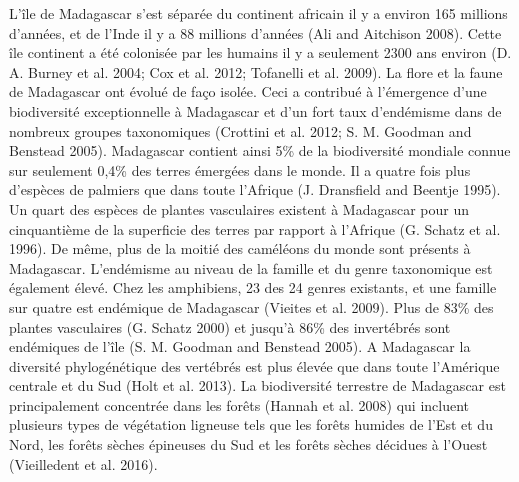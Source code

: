 \documentclass[12pt,]{article}
\begin{document}
L'île de Madagascar s'est séparée du continent africain il y a environ
165 millions d'années, et de l'Inde il y a 88 millions d'années (Ali and
Aitchison 2008). Cette île continent a été colonisée par les humains il
y a seulement 2300 ans environ (D. A. Burney et al. 2004; Cox et al.
2012; Tofanelli et al. 2009). La flore et la faune de Madagascar ont
évolué de faço isolée. Ceci a contribué à l'émergence d'une biodiversité
exceptionnelle à Madagascar et d'un fort taux d'endémisme dans de
nombreux groupes taxonomiques (Crottini et al. 2012; S. M. Goodman and
Benstead 2005). Madagascar contient ainsi 5\% de la biodiversité
mondiale connue sur seulement 0,4\% des terres émergées dans le monde.
Il a quatre fois plus d'espèces de palmiers que dans toute l'Afrique (J.
Dransfield and Beentje 1995). Un quart des espèces de plantes
vasculaires existent à Madagascar pour un cinquantième de la superficie
des terres par rapport à l'Afrique (G. Schatz et al. 1996). De même,
plus de la moitié des caméléons du monde sont présents à Madagascar.
L'endémisme au niveau de la famille et du genre taxonomique est
également élevé. Chez les amphibiens, 23 des 24 genres existants, et une
famille sur quatre est endémique de Madagascar (Vieites et al. 2009).
Plus de 83\% des plantes vasculaires (G. Schatz 2000) et jusqu'à 86\%
des invertébrés sont endémiques de l'île (S. M. Goodman and Benstead
2005). A Madagascar la diversité phylogénétique des vertébrés est plus
élevée que dans toute l'Amérique centrale et du Sud (Holt et al. 2013).
La biodiversité terrestre de Madagascar est principalement concentrée
dans les forêts (Hannah et al. 2008) qui incluent plusieurs types de
végétation ligneuse tels que les forêts humides de l'Est et du Nord, les
forêts sèches épineuses du Sud et les forêts sèches décidues à l'Ouest
(Vieilledent et al. 2016).
\end{document}

